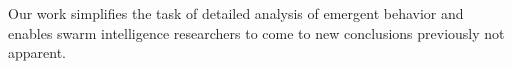 \documentclass{vgtc}
\begin{document}
Our work simplifies the task of detailed analysis of emergent behavior and
enables swarm intelligence researchers to come to new conclusions previously not apparent.




\vspace{50pt}








\end{document}
